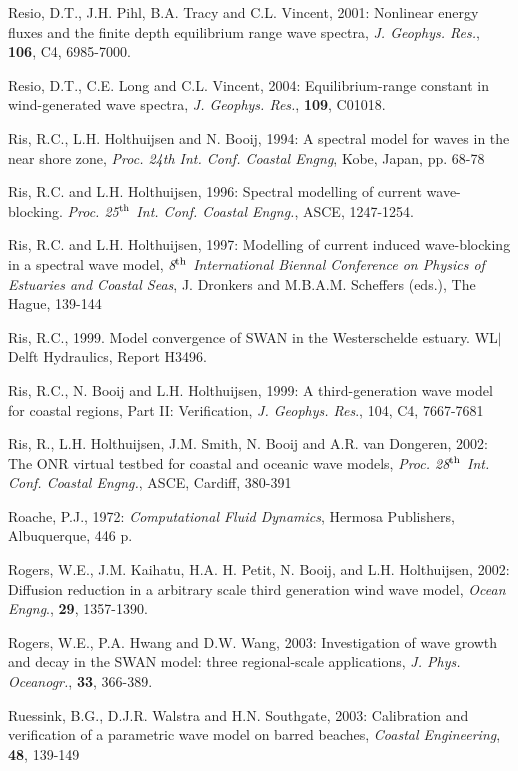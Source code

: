 \documentclass[12pt]{book}
\begin{document}
\begin{thebibliography}{10}
Resio, D.T., J.H. Pihl, B.A. Tracy and C.L. Vincent, 2001: Nonlinear energy fluxes and  the finite depth equilibrium
range wave spectra, {\it J. Geophys. Res.}, {\bf 106}, C4, 6985-7000.

Resio, D.T., C.E. Long and C.L. Vincent, 2004: Equilibrium-range constant in wind-generated wave spectra,
{\it J. Geophys. Res.}, {\bf 109}, C01018.

Ris, R.C., L.H. Holthuijsen and N. Booij, 1994: A spectral model for waves in the near shore zone, {\it Proc.
24th Int. Conf. Coastal Engng}, Kobe, Japan, pp. 68-78

Ris, R.C. and L.H. Holthuijsen, 1996: Spectral modelling of current wave-blocking.
{\it Proc. 25$^{{\rm th}}$ Int. Conf. Coastal Engng.}, ASCE, 1247-1254.

Ris, R.C. and L.H. Holthuijsen, 1997: Modelling of current induced wave-blocking in a spectral wave
model, {\it 8$^{{\rm th}}$ International Biennal Conference on  Physics of Estuaries and Coastal Seas}, J.
Dronkers and M.B.A.M. Scheffers (eds.), The Hague, 139-144

Ris, R.C., 1999. Model convergence of SWAN in the Westerschelde estuary.
WL$\vert$Delft Hydraulics, Report H3496.

Ris, R.C., N. Booij and L.H. Holthuijsen, 1999: A third-generation wave model for coastal regions, Part II:
Verification,  {\it J. Geophys. Res}., 104, C4, 7667-7681

Ris, R., L.H. Holthuijsen, J.M. Smith, N. Booij and A.R. van Dongeren, 2002: The ONR virtual testbed
for coastal and oceanic wave models, {\it Proc. 28$^{{\rm th}}$ Int. Conf. Coastal Engng.}, ASCE, Cardiff, 380-391

Roache, P.J., 1972: {\it Computational Fluid Dynamics}, Hermosa Publishers, Albuquerque, 446 p.

Rogers, W.E., J.M. Kaihatu, H.A. H. Petit, N. Booij, and L.H. Holthuijsen, 2002: Diffusion reduction in a
arbitrary scale third generation wind wave model, {\it Ocean Engng}., {\bf 29}, 1357-1390.

Rogers, W.E., P.A. Hwang and D.W. Wang, 2003: Investigation of wave growth and decay in the SWAN model:
three regional-scale applications, {\it J. Phys. Oceanogr.}, {\bf 33}, 366-389.

Ruessink, B.G., D.J.R. Walstra and H.N. Southgate, 2003: Calibration and verification of a parametric wave model
on barred beaches, {\it Coastal Engineering}, {\bf 48}, 139-149


\end{thebibliography}
\end{document}
